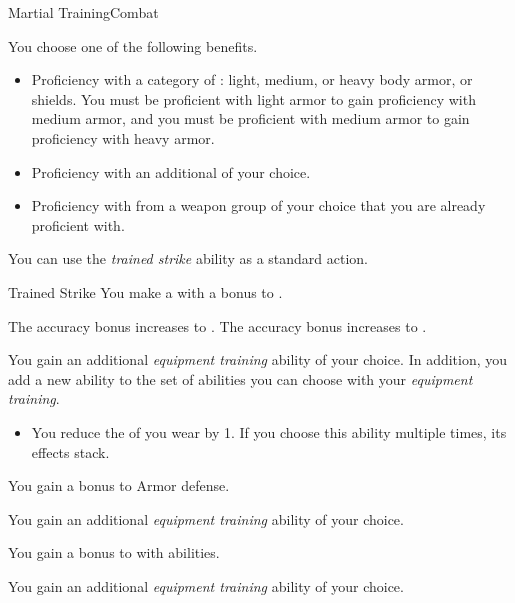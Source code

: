    \begin{feat}{Martial Training}{Combat}

         You choose one of the following benefits.
        \begin{itemize}
            \item Proficiency with a category of : light, medium, or heavy body armor, or shields.
                You must be proficient with light armor to gain proficiency with medium armor, and you must be proficient with medium armor to gain proficiency with heavy armor.
            \item Proficiency with an additional  of your choice.
            \item Proficiency with  from a weapon group of your choice that you are already proficient with.
        \end{itemize}

         You can use the \textit{trained strike} ability as a standard action.
        \begin{freeability}{Trained Strike}
            You make a  with a  bonus to .

            \rankline
             The accuracy bonus increases to .
             The accuracy bonus increases to .
        \end{freeability}

         You gain an additional \textit{equipment training} ability of your choice.
        In addition, you add a new ability to the set of abilities you can choose with your \textit{equipment training}.
        \begin{itemize}
            \item You reduce the  of  you wear by 1.
                If you choose this ability multiple times, its effects stack.
        \end{itemize}

         You gain a  bonus to Armor defense.

         You gain an additional \textit{equipment training} ability of your choice.

         You gain a  bonus to  with  abilities.

         You gain an additional \textit{equipment training} ability of your choice.
    \end{feat}


